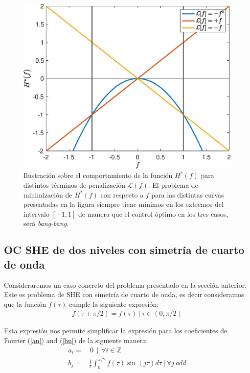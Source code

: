 \begin{figure}[!ht]
    \centering
    \includegraphics[scale=0.5]{img/bang-bang.eps}
    \caption{Ilustración sobre el comportamiento de la función $H^*(f)$ para distintos términos de penalización $\mathcal{L}(f)$. El problema de minimización de $H^*(f)$ con respecto a $f$ para las distintas curvas presentadas en la figura siempre tiene minimos en los extremos del intervalo $[-1,1]$ de manera que el control óptimo en los tres casos, será \emph{bang-bang}.}
    \label{bang-bang}
\end{figure}


\subsection{OC SHE de dos niveles con simetría de cuarto de onda} 

Consideraremos un caso concreto del problema presentado en la sección anterior. Este es problema de SHE con simetría de cuarto de onda, es decir consideramos que la función $f(\tau)$ cumple la siguiente expresión:
\begin{gather}
    f(\tau + \pi/2)   = f(\tau)    \ | \ \tau \in (0,\pi/2)
\end{gather}

Esta expresión nos permite simplificar la expresión para los coeficientes de Fourier (\ref{an}) and (\ref{bn}) de la siguiente manera:
\begin{align}
    a_i = & \  0 \ \ | \  \ \forall i \in \mathbb{Z} \\
    b_j = &  \frac{4}{\pi} \int_0^{\pi/2} f(\tau ) \sin(j\tau)d\tau \ | \ \forall j \ odd
\end{align}

